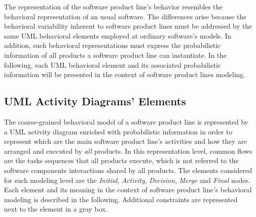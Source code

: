
The representation of the  software product line's behavior resembles the
behavioral representation of an usual software. The differences arise because the
behavioral variability inherent to software product lines must be addressed by
the same UML behavioral elements employed at ordinary software's models. In addition,
such behavioral representations must express the probabilistic information of
all products a software product line can instantiate.   In the following, each
UML behavioral element and its associated probabilistic information will be
presented in the context of software product lines modeling. 










\subsection{UML Activity Diagrams' Elements \label{subsec:umlActivityDiagrams}}

The coarse-grained behavioral model of a software product line is represented
by a UML activity diagram enriched with probabilistic information in order to
represent which are the main software product line's activities and how they
are arranged and executed by \emph{all} products.  In this representation
level, common flows are the tasks sequences that all products execute, which is
not referred to the software components interactions shared by all products.
The elements considered for such modeling level are the \textit{Initial},
\textit{Activity}, \textit{Decision}, \textit{Merge} and \textit{Final} nodes.
Each element and its meaning in the context of software product line's
behavioral modeling is described in the following.
Additional constraints are represented next to the element in a gray box.


